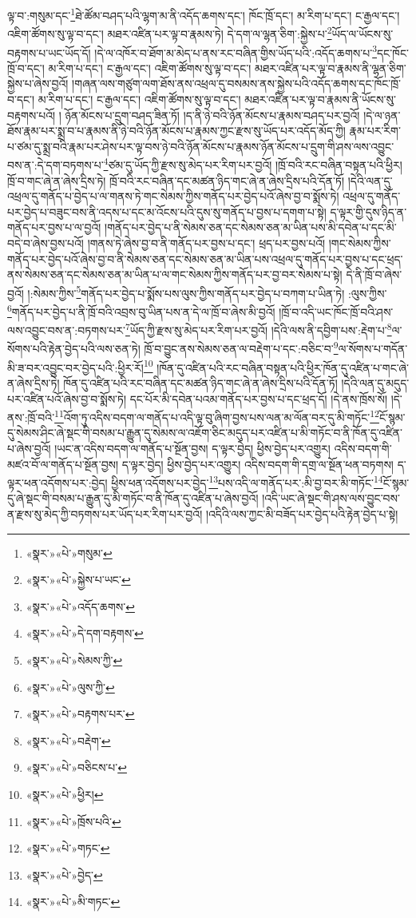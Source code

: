 ལྟ་བ་:གསུམ་དང་\footnote{«སྣར་»«པེ་»གསུམ་}ཐེ་ཚོམ་བཤད་པའི་ལྷག་མ་ནི་འདོད་ཆགས་དང་། ཁོང་ཁྲོ་དང་། མ་རིག་པ་དང་། ང་རྒྱལ་དང་། འཇིག་ཚོགས་སུ་ལྟ་བ་དང་། མཐར་འཛིན་པར་ལྟ་བ་རྣམས་ཏེ། དེ་དག་ལ་ལྷན་ཅིག་:སྐྱེས་པ་\footnote{«སྣར་»«པེ་»སྐྱེས་པ་ཡང་}ཡོད་ལ་ཡོངས་སུ་བརྟགས་པ་ཡང་ཡོད་དོ། །དེ་ལ་འཁོར་བ་ཐོག་མ་མེད་པ་ནས་རང་བཞིན་གྱིས་ཡོད་པའི་:འདོད་ཆགས་པ་\footnote{«སྣར་»«པེ་»འདོད་ཆགས་}དང་ཁོང་ཁྲོ་བ་དང་། མ་རིག་པ་དང་། ང་རྒྱལ་དང་། འཇིག་ཚོགས་སུ་ལྟ་བ་དང་། མཐར་འཛིན་པར་ལྟ་བ་རྣམས་ནི་ལྷན་ཅིག་སྐྱེས་པ་ཞེས་བྱའོ། །གཞན་ལས་གཙུག་ལག་ཐོས་ནས་འཕྲལ་དུ་བསམས་ནས་སྐྱེས་པའི་འདོད་ཆགས་དང་ཁོང་ཁྲོ་བ་དང་། མ་རིག་པ་དང་། ང་རྒྱལ་དང་། འཇིག་ཚོགས་སུ་ལྟ་བ་དང་། མཐར་འཛིན་པར་ལྟ་བ་རྣམས་ནི་ཡོངས་སུ་བརྟགས་པའོ། །
ཉོན་མོངས་པ་དྲུག་བཤད་ཟིན་ཏོ། །ད་ནི་ཉེ་བའི་ཉོན་མོངས་པ་རྣམས་བཤད་པར་བྱའོ། །དེ་ལ་ཉན་ཐོས་རྣམ་པར་སྨྲ་བ་པ་རྣམས་ནི་ཉེ་བའི་ཉོན་མོངས་པ་རྣམས་ཀྱང་རྫས་སུ་ཡོད་པར་འདོད་མོད་ཀྱི། རྣམ་པར་རིག་པ་ཙམ་དུ་སྨྲ་བའི་རྣམ་པར་ཤེས་པར་ལྟ་བས་ཉེ་བའི་ཉོན་མོངས་པ་རྣམས་ཉོན་མོངས་པ་དྲུག་གི་ཤས་ལས་འབྱུང་བས་ན་:དེ་དག་བཏགས་པ་\footnote{«སྣར་»«པེ་»དེ་དག་བརྟགས་}ཙམ་དུ་ཡོད་ཀྱི་རྫས་སུ་མེད་པར་རིག་པར་བྱའོ། །ཁྲོ་བའི་རང་བཞིན་བསྟན་པའི་ཕྱིར། ཁྲོ་བ་གང་ཞེ་ན་ཞེས་དྲིས་ཏེ། ཁྲོ་བའི་རང་བཞིན་དང་མཚན་ཉིད་གང་ཞེ་ན་ཞེས་དྲིས་པའི་དོན་ཏོ། །དེའི་ལན་དུ་འཕྲལ་དུ་གནོད་པ་བྱེད་པ་ལ་གནས་ཏེ་གང་སེམས་ཀྱིས་གནོད་པར་བྱེད་པའོ་ཞེས་བྱ་བ་སྨོས་ཏེ། འཕྲལ་དུ་གནོད་པར་བྱེད་པ་བཟུང་བས་ནི་འདས་པ་དང་མ་འོངས་པའི་དུས་སུ་གནོད་པ་བྱས་པ་དགག་པ་སྟེ། ད་ལྟར་གྱི་དུས་ཉིད་ན་གནོད་པར་བྱས་པ་ལ་བྱའོ། །གནོད་པར་བྱེད་པ་ནི་སེམས་ཅན་དང་སེམས་ཅན་མ་ཡིན་པས་མི་དབེན་པ་དང་མི་བདེ་བ་ཞེས་བྱས་པའོ། །གནས་ཏེ་ཞེས་བྱ་བ་ནི་གནོད་པར་བྱས་པ་དང་། ཕྲད་པར་བྱས་པའོ། །གང་སེམས་ཀྱིས་གནོད་པར་བྱེད་པའོ་ཞེས་བྱ་བ་ནི་སེམས་ཅན་དང་སེམས་ཅན་མ་ཡིན་པས་འཕྲལ་དུ་གནོད་པར་བྱས་པ་དང་ཕྲད་ནས་སེམས་ཅན་དང་སེམས་ཅན་མ་ཡིན་པ་ལ་གང་སེམས་ཀྱིས་གནོད་པར་བྱ་བར་སེམས་པ་སྟེ། དེ་ནི་ཁྲོ་བ་ཞེས་བྱའོ། །:སེམས་ཀྱིས་\footnote{«སྣར་»«པེ་»སེམས་ཀྱི་}གནོད་པར་བྱེད་པ་སྨོས་པས་ལུས་ཀྱིས་གནོད་པར་བྱེད་པ་བཀག་པ་ཡིན་ཏེ། :ལུས་ཀྱིས་\footnote{«སྣར་»«པེ་»ལུས་ཀྱི་}གནོད་པར་བྱེད་པ་ནི་ཁྲོ་བའི་འབྲས་བུ་ཡིན་པས་ན་དེ་ལ་ཁྲོ་བ་ཞེས་མི་བྱའོ། །ཁྲོ་བ་འདི་ཡང་ཁོང་ཁྲོ་བའི་ཤས་ལས་འབྱུང་བས་ན་:བཏགས་པར་\footnote{«སྣར་»«པེ་»བརྟགས་པར་}ཡོད་ཀྱི་རྫས་སུ་མེད་པར་རིག་པར་བྱའོ། །དེའི་ལས་ནི་དབྱིག་པས་:རྡེག་པ་\footnote{«སྣར་»«པེ་»བརྡེག་}ལ་སོགས་པའི་རྟེན་བྱེད་པའི་ལས་ཅན་ཏེ། ཁྲོ་བ་བྱུང་ནས་སེམས་ཅན་ལ་བརྡེག་པ་དང་:བཅིང་བ་\footnote{«སྣར་»«པེ་»བཅིངས་པ་}ལ་སོགས་པ་གདོན་མི་ཟ་བར་འབྱུང་བར་བྱེད་པའི་:ཕྱིར་རོ།\footnote{«སྣར་»«པེ་»ཕྱིར།} །ཁོན་དུ་འཛིན་པའི་རང་བཞིན་བསྟན་པའི་ཕྱིར་ཁོན་དུ་འཛིན་པ་གང་ཞེ་ན་ཞེས་དྲིས་ཏེ། ཁོན་དུ་འཛིན་པའི་རང་བཞིན་དང་མཚན་ཉིད་གང་ཞེ་ན་ཞེས་དྲིས་པའི་དོན་ཏོ། །དེའི་ལན་དུ་མདུད་པར་འཛིན་པའོ་ཞེས་བྱ་བ་སྨོས་ཏེ། དང་པོར་མི་དབེན་པའམ་གནོད་པར་བྱས་པ་དང་ཕྲད་དོ། །དེ་ནས་ཁྲོས་སོ། །དེ་ནས་:ཁྲོ་བའི་\footnote{«སྣར་»«པེ་»ཁྲོས་པའི་}འོག་ཏུ་འདིས་བདག་ལ་གནོད་པ་འདི་ལྟ་བུ་ཞིག་བྱས་པས་ལན་མ་ལོན་བར་དུ་མི་གཏོང་\footnote{«སྣར་»«པེ་»གཏང་}ངོ་སྙམ་དུ་སེམས་ཤིང་ཞེ་སྡང་གི་བསམ་པ་རྒྱུན་དུ་སེམས་ལ་འཇོག་ཅིང་མདུད་པར་འཛིན་པ་མི་གཏོང་བ་ནི་ཁོན་དུ་འཛིན་པ་ཞེས་བྱའོ། །ཡང་ན་འདིས་བདག་ལ་གནོད་པ་སྔོན་བྱས། ད་ལྟར་བྱེད། ཕྱིས་བྱེད་པར་འགྱུར། འདིས་བདག་གི་མཛའ་བོ་ལ་གནོད་པ་སྔོན་བྱས། ད་ལྟར་བྱེད། ཕྱིས་བྱེད་པར་འགྱུར། འདིས་བདག་གི་དགྲ་ལ་སྔོན་ཕན་བཏགས། ད་ལྟར་ཕན་འདོགས་པར་:བྱེད། ཕྱིས་ཕན་འདོགས་པར་བྱེད་\footnote{«སྣར་»«པེ་»བྱེད་}པས་འདི་ལ་གནོད་པར་:མི་བྱ་བར་མི་གཏོང་\footnote{«སྣར་»«པེ་»མི་གཏང་}ངོ་སྙམ་དུ་ཞེ་སྡང་གི་བསམ་པ་རྒྱུན་དུ་མི་གཏོང་བ་ནི་ཁོན་དུ་འཛིན་པ་ཞེས་བྱའོ། །འདི་ཡང་ཞེ་སྡང་གི་ཤས་ལས་བྱུང་བས་ན་རྫས་སུ་མེད་ཀྱི་བཏགས་པར་ཡོད་པར་རིག་པར་བྱའོ། །འདིའི་ལས་ཀྱང་མི་བཟོད་པར་བྱེད་པའི་རྟེན་བྱེད་པ་སྟེ། 